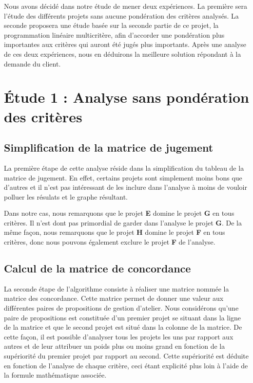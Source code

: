 \documentclass[a4paper,10pt]{article}
\begin{document}
Nous avons décidé dans notre étude de mener deux expériences. La première sera l'étude des différents projets sans aucune pondération des critères analysés. La seconde proposera une étude basée sur la seconde partie de ce projet, la programmation linéaire multicritère, afin d'accorder une pondération plus importantes aux critères qui auront été jugés plus importants. Après une analyse de ces deux expériences, nous en déduirons la meilleure solution répondant à la demande du client.

\section{Étude 1 : Analyse sans pondération des critères}

\subsection{Simplification de la matrice de jugement}

La première étape de cette analyse réside dans la simplification du tableau de la matrice de jugement. En effet, certains projets sont simplement moins bons que d'autres et il n'est pas intéressant de les inclure dans l'analyse à moins de vouloir polluer les résulats et le graphe résultant.

Dans notre cas, nous remarquons que le projet \textbf{E} domine le projet \textbf{G} en tous critères. Il n'est dont pas primordial de garder dans l'analyse le projet \textbf{G}. De la même façon, nous remarquons que le projet \textbf{H} domine le projet \textbf{F} en tous critères, donc nous pouvons également exclure le projet \textbf{F} de l'analyse.


\subsection{Calcul de la matrice de concordance}

La seconde étape de l'algorithme consiste à réaliser une matrice nommée la matrice des concordance. Cette matrice permet de donner une valeur aux différentes paires de propositions de gestion d'atelier. Nous considérons qu'une paire de propositions est constituée d'un premier projet se situant dans la ligne de la matrice et que le second projet est situé dans la colonne de la matrice. De cette façon, il est possible d'analyser tous les projets les uns par rapport aux autres et de leur attribuer un poids plus ou moins grand en fonction de la supériorité du premier projet par rapport au second. Cette supériorité est déduite en fonction de l'analyse de chaque critère, ceci étant explicité plus loin à l'aide de la formule mathématique associée. 
\end{document}
